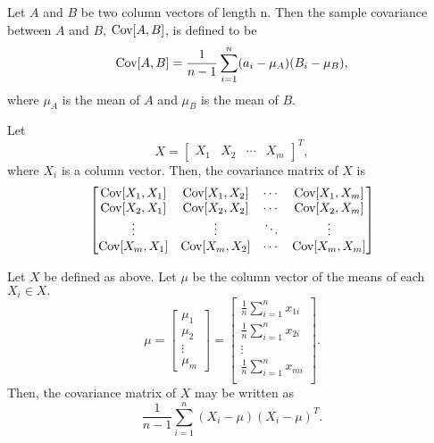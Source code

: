 \documentclass[11pt, oneside]{article}   	%
\begin{document}
\begin{definition}
Let $A$ and $B$ be two column vectors of length n. Then the sample covariance between $A$ and $B$, $\text{Cov}[A,B]$, is defined to be 
$$ \text{Cov}[A,B] = \frac{1}{n-1} \sum_{i=1}^n (a_i - \mu_A)(B_i - \mu_B),$$
where $\mu_A$ is the mean of $A$ and $\mu_B$ is the mean of $B$.
\end{definition}

\begin{definition}
Let 
$$
X = 
\begin{bmatrix}
X_1 & X_2 & \cdots & X_m
\end{bmatrix}^T,
$$
where $X_i$ is a column vector.
Then, the covariance matrix of $X$ is
$$
\begin{bmatrix}
\text{Cov}[X_1,X_1] & \text{Cov}[X_1,X_2] & \cdots & \text{Cov}[X_1, X_m]\\
\text{Cov}[X_2,X_1] & \text{Cov}[X_2, X_2] & \cdots & \text{Cov}[X_2,X_m]\\
\vdots & \vdots & \ddots & \vdots \\
\text{Cov}[X_m, X_1] & \text{Cov}[X_m,X_2] & \cdots & \text{Cov}[X_m,X_m]
\end{bmatrix}
$$
\end{definition}

\begin{lemma}
\label{lemma:covarmatrix}
Let $X$ be defined as above.
Let $\mu$ be the column vector of the means of each $X_i \in X.$
$$ \mu = 
\begin{bmatrix}
\mu_1 \\
\mu_2 \\
\vdots \\
\mu_m
\end{bmatrix}
= 
\begin{bmatrix}
\frac{1}{n} \sum_{i=1}^n x_{1i} \\[6pt]
\frac{1}{n} \sum_{i=1}^n x_{2i} \\[6pt]
\vdots\\
\frac{1}{n} \sum_{i=1}^n x_{mi} \\
\end{bmatrix}.
$$
Then, the covariance matrix of $X$ may be written as 
$$\frac{1}{n-1}\sum_{i=1}^n (X_i - \mu)(X_i-\mu)^T.$$
\end{lemma}
\end{document}
